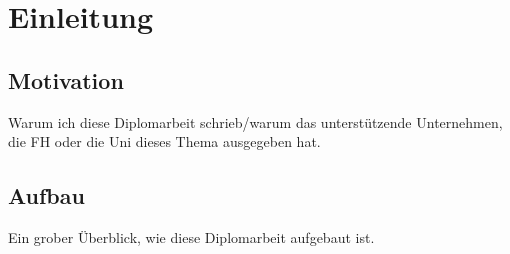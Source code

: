 \chapter*{Einleitung} 


\section*{Motivation}

Warum ich diese Diplomarbeit schrieb/warum das unterstützende Unternehmen, die FH oder die Uni dieses Thema ausgegeben hat.

\section*{Aufbau}
Ein grober Überblick, wie diese Diplomarbeit aufgebaut ist.
